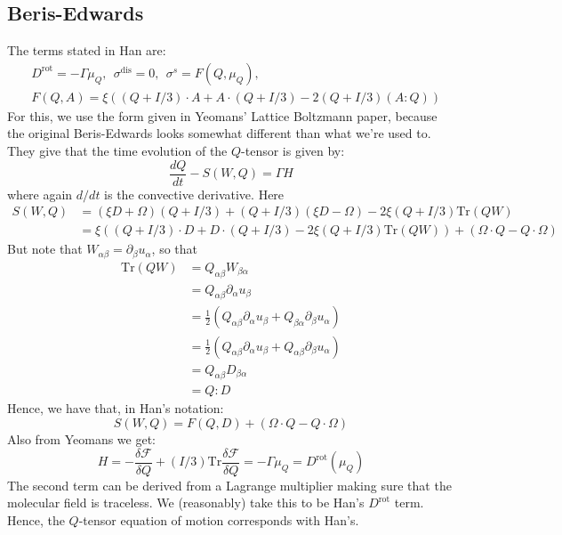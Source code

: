 \documentclass[reqno]{article}
\newcommand\rot{\text{rot}}
\newcommand\dis{\text{dis}}
\newcommand\tr{\text{Tr}}
\begin{document}
\subsection{Beris-Edwards}
The terms stated in Han are:
\begin{equation}
\begin{split}
  &D^\rot = -\Gamma \mu_Q,
  \:\:
  \sigma^\dis = 0,
  \:\:
  \sigma^s = F (Q, \mu_Q), \\
  &F(Q, A)
  = \xi \left( (Q + I/3) \cdot A + A \cdot (Q + I / 3) - 2(Q + I / 3)(A : Q) \right)
\end{split}
\end{equation}
For this, we use the form given in Yeomans' Lattice Boltzmann paper, because the
original Beris-Edwards looks somewhat different than what we're used to.
They give that the time evolution of the $Q$-tensor is given by:
\begin{equation}
  \frac{dQ}{dt} - S(W, Q) = \Gamma H
\end{equation}
where again $d/dt$ is the convective derivative.
Here
\begin{equation}
\begin{split}
  S(W, Q)
  &= (\xi D + \Omega)(Q + I / 3)
  + (Q + I/3)(\xi D - \Omega)
  - 2 \xi (Q + I / 3) \tr(QW) \\
  &= \xi \left(
    (Q + I/3) \cdot D
    + D \cdot (Q + I/3)
    - 2 \xi (Q + I / 3) \tr(QW)
  \right)
  + (\Omega \cdot Q - Q \cdot \Omega)
\end{split}
\end{equation}
But note that $W_{\alpha \beta} = \partial_\beta u_\alpha$, so that
\begin{align*}
  \tr(QW)
  &= Q_{\alpha \beta} W_{\beta \alpha} \\
  &= Q_{\alpha \beta} \partial_{\alpha} u_\beta \\
  &= \frac12 \left(
    Q_{\alpha \beta} \partial_\alpha u_\beta
    + Q_{\beta \alpha} \partial_\beta u_\alpha
    \right) \\
  &= \frac12 \left(
    Q_{\alpha \beta} \partial_\alpha u_\beta
    + Q_{\alpha \beta} \partial_\beta u_\alpha
    \right) \\
  &= Q_{\alpha \beta} D_{\beta \alpha} \\
  &= Q : D
\end{align*}
Hence, we have that, in Han's notation:
\begin{equation}
  S(W, Q)
  = F(Q, D) + (\Omega \cdot Q - Q \cdot \Omega)
\end{equation}
Also from Yeomans we get:
\begin{equation}
  H
  = - \frac{\delta \mathcal{F}}{\delta Q}
  + (I / 3) \tr \frac{\delta \mathcal{F}}{\delta Q}
  = - \Gamma \mu_Q
  = D^\rot (\mu_Q)
\end{equation}
The second term can be derived from a Lagrange multiplier making sure that the
molecular field is traceless.
We (reasonably) take this to be Han's $D^\rot$ term.
Hence, the $Q$-tensor equation of motion corresponds with Han's.
\end{document}
